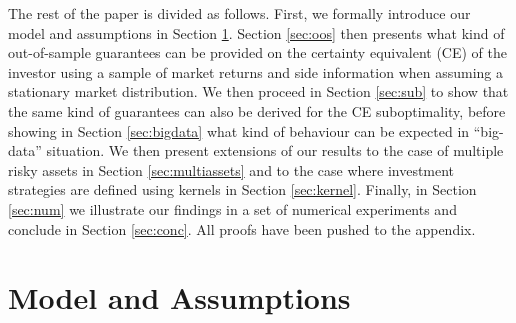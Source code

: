 \documentclass[]{interact}
\theoremstyle{plain}%
\theoremstyle{definition}
\theoremstyle{remark}
\def\Expect{{\mathbb E}}
\newcommand{\0}{\V{0}}
\newcommand{\1}{\V{1}}
\theoremstyle{plain}
\theoremstyle{definition}
\begin{document}
The rest of the paper is divided as follows. First, we formally introduce our model and
assumptions in Section \ref{sec:model}. Section \ref{sec:oos} then presents what kind of
out-of-sample guarantees can be provided on the certainty equivalent (CE) of the investor
using a sample of market returns and side information when assuming a stationary market
distribution. We then proceed in Section \ref{sec:sub} to show that the same kind of
guarantees can also be derived for the CE suboptimality, before showing in Section
\ref{sec:bigdata} what kind of behaviour can be expected in ``big-data'' situation. We
then present extensions of our results to the case of multiple risky assets in Section \ref{sec:multiassets} and to the case where investment strategies are defined using kernels in Section \ref{sec:kernel}. Finally, in Section \ref{sec:num} we illustrate our findings in a set of numerical experiments and conclude in Section \ref{sec:conc}. All proofs have been pushed to the appendix. %




%
\section{Model and Assumptions}\label{sec:model}
\newcommand{\F}{F}
\newcommand{\Fhat}{{\hat{\F}}}
\newcommand{\qhat}{{\hat{q}}}
\newcommand{\Sx}{{\mathcal{S}_X}}
\newcommand{\Sr}{{\mathcal{S}_R}}
\newcommand{\Sn}{\mathcal{S}_n}
\newcommand{\urange}{u_{\mbox{\footnotesize range}}}
\newcommand{\investA}{{\pi}}





\end{document}
